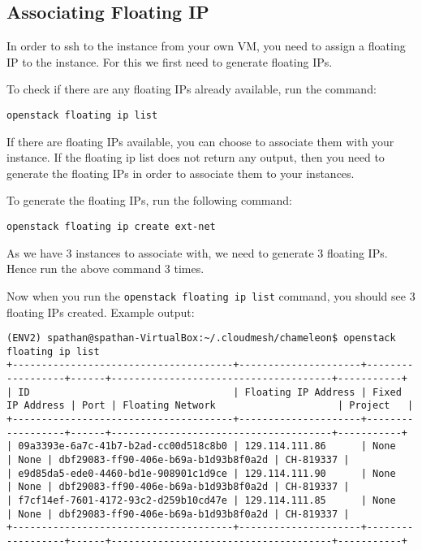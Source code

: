 \subsection{Associating Floating IP}

In order to ssh to the instance from your own VM, you need to assign a
floating IP to the instance. For this we first need to generate floating
IPs.

To check if there are any floating IPs already available, run the
command:

\texttt{openstack\ floating\ ip\ list}

If there are floating IPs available, you can choose to associate them
with your instance. If the floating ip list does not return any output,
then you need to generate the floating IPs in order to associate them to
your instances.

To generate the floating IPs, run the following command:

\texttt{openstack\ floating\ ip\ create\ ext-net}

As we have 3 instances to associate with, we need to generate 3 floating
IPs. Hence run the above command 3 times.

Now when you run the \texttt{openstack\ floating\ ip\ list} command, you
should see 3 floating IPs created. Example output:

\begin{lstlisting}
(ENV2) spathan@spathan-VirtualBox:~/.cloudmesh/chameleon$ openstack floating ip list
+--------------------------------------+---------------------+------------------+------+--------------------------------------+-----------+
| ID                                   | Floating IP Address | Fixed IP Address | Port | Floating Network                     | Project   |
+--------------------------------------+---------------------+------------------+------+--------------------------------------+-----------+
| 09a3393e-6a7c-41b7-b2ad-cc00d518c8b0 | 129.114.111.86      | None             | None | dbf29083-ff90-406e-b69a-b1d93b8f0a2d | CH-819337 |
| e9d85da5-ede0-4460-bd1e-908901c1d9ce | 129.114.111.90      | None             | None | dbf29083-ff90-406e-b69a-b1d93b8f0a2d | CH-819337 |
| f7cf14ef-7601-4172-93c2-d259b10cd47e | 129.114.111.85      | None             | None | dbf29083-ff90-406e-b69a-b1d93b8f0a2d | CH-819337 |
+--------------------------------------+---------------------+------------------+------+--------------------------------------+-----------+
\end{lstlisting}

